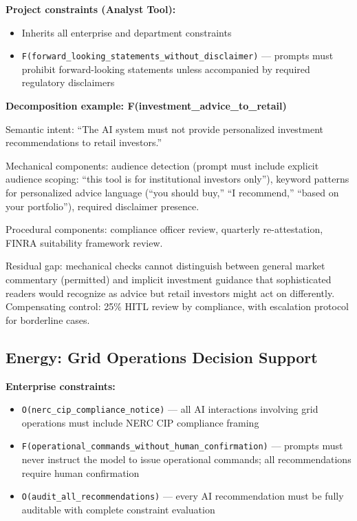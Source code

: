 \textbf{Project constraints (Analyst Tool):}
\begin{itemize}
  \item Inherits all enterprise and department constraints
  \item \texttt{F(forward\_\allowbreak{}looking\_\allowbreak{}statements\_\allowbreak{}without\_\allowbreak{}disclaimer)} --- prompts must prohibit forward-looking statements unless accompanied by required regulatory disclaimers
\end{itemize}


\textbf{Decomposition example: F(investment\_\allowbreak{}advice\_\allowbreak{}to\_\allowbreak{}retail)}

Semantic intent: ``The AI system must not provide personalized investment recommendations to retail investors.''

Mechanical components: audience detection (prompt must include explicit audience scoping: ``this tool is for institutional investors only''), keyword patterns for personalized advice language (``you should buy,'' ``I recommend,'' ``based on your portfolio''), required disclaimer presence.

Procedural components: compliance officer review, quarterly re-attestation, FINRA suitability framework review.

Residual gap: mechanical checks cannot distinguish between general market commentary (permitted) and implicit investment guidance that sophisticated readers would recognize as advice but retail investors might act on differently. Compensating control: 25\% HITL review by compliance, with escalation protocol for borderline cases.

\subsection{Energy: Grid Operations Decision Support}
\label{sec:clad-examples-B-1-3}


\textbf{Enterprise constraints:}
\begin{itemize}
  \item \texttt{O(nerc\_\allowbreak{}cip\_\allowbreak{}compliance\_\allowbreak{}notice)} --- all AI interactions involving grid operations must include NERC CIP compliance framing
  \item \texttt{F(operational\_\allowbreak{}commands\_\allowbreak{}without\_\allowbreak{}human\_\allowbreak{}confirmation)} --- prompts must never instruct the model to issue operational commands; all recommendations require human confirmation
  \item \texttt{O(audit\_\allowbreak{}all\_\allowbreak{}recommendations)} --- every AI recommendation must be fully auditable with complete constraint evaluation
\end{itemize}


